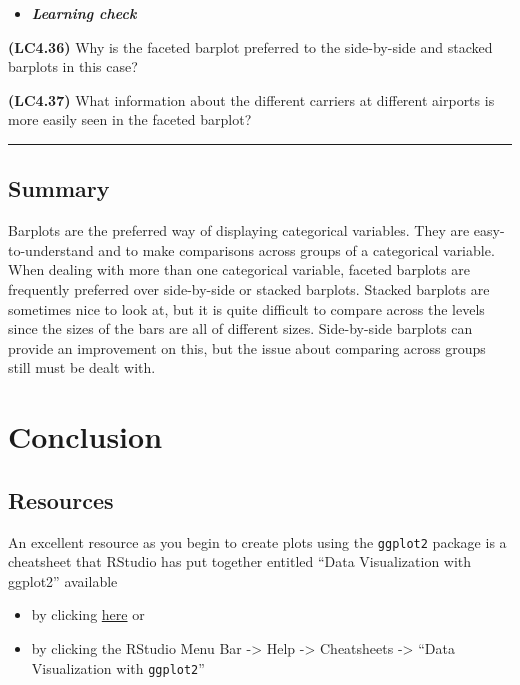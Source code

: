 \documentclass[]{tufte-book}
\let\oldrule=\rule
\renewcommand{\rule}[1]{\oldrule{\linewidth}}
\providecommand{\tightlist}{%
  \setlength{\itemsep}{0pt}\setlength{\parskip}{0pt}}
\newenvironment{rmdblock}[1]
  {\begin{shaded*}
  \begin{itemize}
  \renewcommand{\labelitemi}{
    \raisebox{-.7\height}[0pt][0pt]{
    }
  }
  \item
  }
  {
  \end{itemize}
  \end{shaded*}
  }
\newenvironment{learncheck}
  {\begin{rmdblock}{warning}}
  {\end{rmdblock}}
\theoremstyle{definition}
\theoremstyle{definition}
\theoremstyle{remark}
\begin{document}
\begin{learncheck}
\textbf{\emph{Learning check}}
\end{learncheck}

\textbf{(LC4.36)} Why is the faceted barplot preferred to the
side-by-side and stacked barplots in this case?

\textbf{(LC4.37)} What information about the different carriers at
different airports is more easily seen in the faceted barplot?

\begin{center}\rule{0.5\linewidth}{\linethickness}\end{center}

\subsection{Summary}\label{summary-4}

Barplots are the preferred way of displaying categorical variables. They
are easy-to-understand and to make comparisons across groups of a
categorical variable. When dealing with more than one categorical
variable, faceted barplots are frequently preferred over side-by-side or
stacked barplots. Stacked barplots are sometimes nice to look at, but it
is quite difficult to compare across the levels since the sizes of the
bars are all of different sizes. Side-by-side barplots can provide an
improvement on this, but the issue about comparing across groups still
must be dealt with.

\section{Conclusion}\label{conclusion}

\subsection{Resources}\label{resources}

An excellent resource as you begin to create plots using the
\texttt{ggplot2} package is a cheatsheet that RStudio has put together
entitled ``Data Visualization with ggplot2'' available

\begin{itemize}
\tightlist
\item
  by clicking
  \href{https://www.rstudio.com/wp-content/uploads/2016/11/ggplot2-cheatsheet-2.1.pdf}{here}
  or
\item
  by clicking the RStudio Menu Bar -\textgreater{} Help -\textgreater{}
  Cheatsheets -\textgreater{} ``Data Visualization with
  \texttt{ggplot2}''
\end{itemize}
\end{document}
